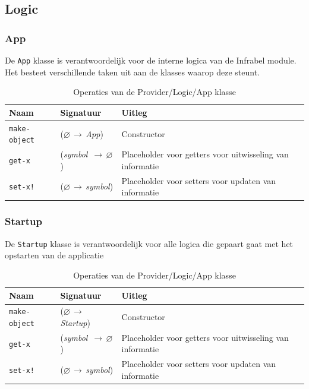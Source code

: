 \documentclass[a4paper, 11pt]{article}
\newcommand{\naar}{\,$\rightarrow$\,}
\renewcommand{\empty}{$\varnothing$}
\newcommand{\<}{\scriptsize\textless\normalsize}
\renewcommand{\>}{\scriptsize\textgreater\normalsize}
\begin{document}
\subsection{Logic} %

\subsubsection{App} %
De \texttt{App} klasse is verantwoordelijk voor de interne logica van de Infrabel module. Het besteet verschillende taken uit aan de klasses waarop deze steunt.
\begin{table}[H]
	\begin{center}
		\begin{tabular}{|l l l|}
			\hline
			\textbf{Naam} & \textbf{Signatuur} & \textbf{Uitleg}\\
			\hline
			\texttt{make-object} & (\empty \naar \textit{App}) & Constructor\\
			\hline
			\texttt{get-x} & (\textit{symbol} \naar \empty) & Placeholder voor getters voor uitwisseling van informatie\\
			\texttt{set-x!} & (\empty \naar \textit{symbol}) & Placeholder voor setters voor updaten van informatie\\
			\hline
		\end{tabular}
		\caption{Operaties van de Provider/Logic/App klasse}
	\end{center}
\end{table}

\subsubsection{Startup} %
De \texttt{Startup} klasse is verantwoordelijk voor alle logica die gepaart gaat met het opstarten van de applicatie
\begin{table}[H]
	\begin{center}
		\begin{tabular}{|l l l|}
			\hline
			\textbf{Naam} & \textbf{Signatuur} & \textbf{Uitleg}\\
			\hline
			\texttt{make-object} & (\empty \naar \textit{Startup}) & Constructor\\
			\hline
			\texttt{get-x} & (\textit{symbol} \naar \empty) & Placeholder voor getters voor uitwisseling van informatie\\
			\texttt{set-x!} & (\empty \naar \textit{symbol}) & Placeholder voor setters voor updaten van informatie\\
			\hline
		\end{tabular}
		\caption{Operaties van de Provider/Logic/App klasse}
	\end{center}
\end{table}
\end{document}
